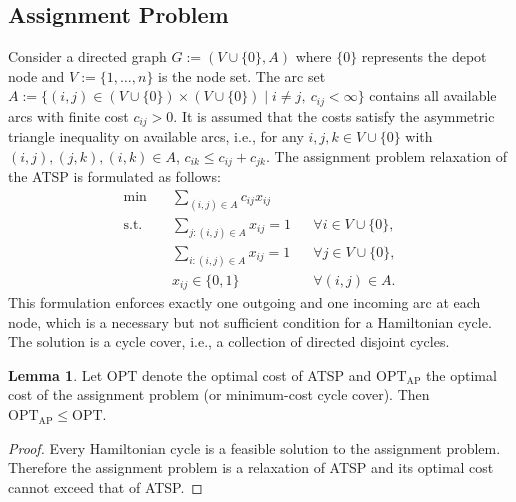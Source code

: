 \documentclass[12pt]{report}
\theoremstyle{definition}
\newtheorem{lemma}{Lemma}
\begin{document}
\subsection{Assignment Problem}
Consider a directed graph \(G:=(V\cup\{0\}, A)\) where $\{0\}$ represents the depot node and \(V:=\{1,\dots,n\}\) is the node set. The arc set \(A := \{(i,j) \in (V \cup \{0\})\times(V\cup \{0\}) \mid i \neq j,\ c_{ij} < \infty \}\) contains all available arcs with finite cost $c_{ij} > 0$. It is assumed that the costs satisfy the asymmetric triangle inequality on available arcs, i.e., for any $i,j,k \in V \cup \{0\}$ with \((i,j),(j,k),(i,k) \in A\), \( c_{ik} \leq c_{ij} + c_{jk} \). The assignment problem relaxation of the ATSP is formulated as follows:
\begin{align}
\min \quad & \sum_{(i,j) \in A} c_{ij} x_{ij} \label{eq:ap_obj}\\
\text{s.t.} \quad 
& \sum_{j:(i,j) \in A} x_{ij} = 1 && \forall i \in V \cup \{0\}, \label{eq:ap_out}\\
& \sum_{i:(i,j) \in A} x_{ij} = 1 && \forall j \in V \cup \{0\}, \label{eq:ap_in}\\
& x_{ij} \in \{0,1\}  && \forall (i,j) \in A. \label{eq:ap_binary}
\end{align}
This formulation enforces exactly one outgoing and one incoming arc at each node, which is a necessary but not sufficient condition for a Hamiltonian cycle. The solution is a cycle cover, i.e., a collection of directed disjoint cycles.

\begin{lemma}
\label{Ass_cover}
Let $\mathrm{OPT}$ denote the optimal cost of ATSP and 
$\mathrm{OPT}_{\mathrm{AP}}$ the optimal cost of the assignment problem (or minimum-cost cycle cover). Then \( \mathrm{OPT}_{\mathrm{AP}} \le \mathrm{OPT}\).
\end{lemma}
\begin{proof}
Every Hamiltonian cycle is a feasible solution to the assignment problem. Therefore the assignment problem is a relaxation of ATSP and its optimal cost cannot exceed that of ATSP. 
\end{proof}
\end{document}
